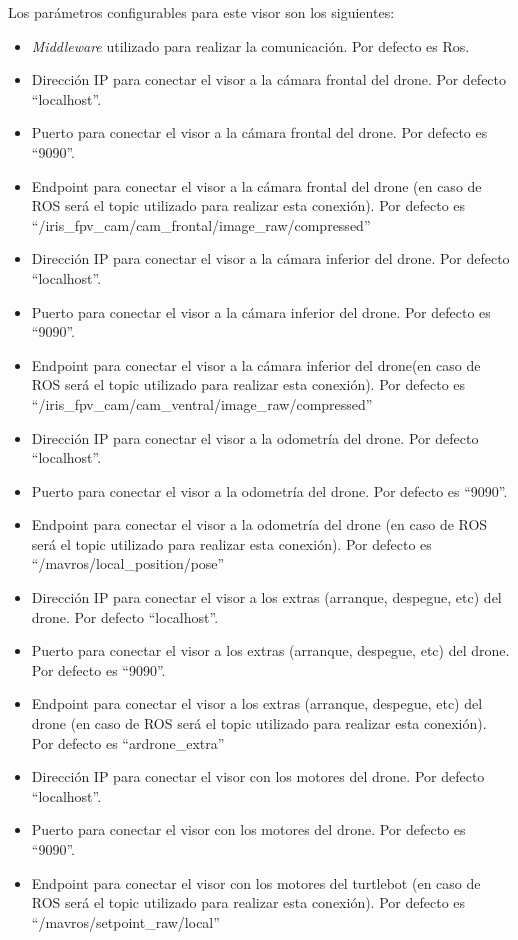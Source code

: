 Los parámetros configurables para este visor son los siguientes:
\begin{itemize}
\item \textit{Middleware} utilizado para realizar la comunicación. Por defecto es Ros.
\item Dirección IP para conectar el visor a la cámara frontal del drone. Por defecto ``localhost''.
\item Puerto para conectar el visor a la cámara frontal del drone. Por defecto es ``9090''.
\item Endpoint para conectar el visor a la cámara frontal del drone (en caso de ROS será el topic utilizado para realizar esta conexión). Por defecto es ``/iris\_fpv\_cam/cam\_frontal/image\_raw/compressed''
\item Dirección IP para conectar el visor a la cámara inferior del drone. Por defecto ``localhost''.
\item Puerto para conectar el visor a la cámara inferior del drone. Por defecto es ``9090''.
\item Endpoint para conectar el visor a la cámara inferior del drone(en caso de ROS será el topic utilizado para realizar esta conexión). Por defecto es ``/iris\_fpv\_cam/cam\_ventral/image\_raw/compressed''
\item Dirección IP para conectar el visor a la odometría del drone. Por defecto ``localhost''.
\item Puerto para conectar el visor a la odometría del drone. Por defecto es ``9090''.
\item Endpoint para conectar el visor a la odometría del drone (en caso de ROS será el topic utilizado para realizar esta conexión). Por defecto es ``/mavros/local\_position/pose''
\item Dirección IP para conectar el visor a los extras (arranque, despegue, etc) del drone. Por defecto ``localhost''.
\item Puerto para conectar el visor  a los extras (arranque, despegue, etc) del drone. Por defecto es ``9090''.
\item Endpoint para conectar el visor  a los extras (arranque, despegue, etc) del drone (en caso de ROS será el topic utilizado para realizar esta conexión). Por defecto es ``ardrone\_extra''
\item Dirección IP para conectar el visor con los motores del drone. Por defecto ``localhost''.
\item Puerto para conectar el visor con los motores del drone. Por defecto es ``9090''.
\item Endpoint para conectar el visor con los motores del turtlebot (en caso de ROS será el topic utilizado para realizar esta conexión). Por defecto es ``/mavros/setpoint\_raw/local''
\end{itemize}

